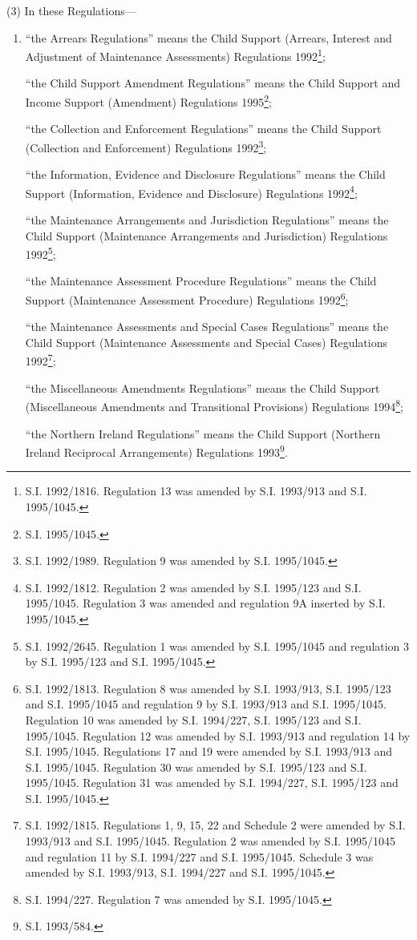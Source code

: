 \documentclass[a4paper]{article}
\begin{document}
(3) In these Regulations—
\begin{enumerate}\item[]
“the Arrears Regulations” means the Child Support (Arrears, Interest and Adjustment of Maintenance Assessments) Regulations 1992\footnote{\frenchspacing S.I. 1992/1816. Regulation 13 was amended by S.I. 1993/913 and S.I. 1995/1045.};

“the Child Support Amendment Regulations” means the Child Support and Income Support (Amendment) Regulations 1995\footnote{\frenchspacing S.I. 1995/1045.};

“the Collection and Enforcement Regulations” means the Child Support (Collection and Enforcement) Regulations 1992\footnote{\frenchspacing S.I. 1992/1989. Regulation 9 was amended by S.I. 1995/1045.};

“the Information, Evidence and Disclosure Regulations” means the Child Support (Information, Evidence and Disclosure) Regulations 1992\footnote{\frenchspacing S.I. 1992/1812. Regulation 2 was amended by S.I. 1995/123 and S.I. 1995/1045. Regulation 3 was amended and regulation 9A inserted by S.I. 1995/1045.};

“the Maintenance Arrangements and Jurisdiction Regulations” means the Child Support (Maintenance Arrangements and Jurisdiction) Regulations 1992\footnote{\frenchspacing S.I. 1992/2645. Regulation 1 was amended by S.I. 1995/1045 and regulation 3 by S.I. 1995/123 and S.I. 1995/1045.};

“the Maintenance Assessment Procedure Regulations” means the Child Support (Maintenance Assessment Procedure) Regulations 1992\footnote{\frenchspacing S.I. 1992/1813. Regulation 8 was amended by S.I. 1993/913, S.I. 1995/123 and S.I. 1995/1045 and regulation 9 by S.I. 1993/913 and S.I. 1995/1045. Regulation 10 was amended by S.I. 1994/227, S.I. 1995/123 and S.I. 1995/1045. Regulation 12 was amended by S.I. 1993/913 and regulation 14 by S.I. 1995/1045. Regulations 17 and 19 were amended by S.I. 1993/913 and S.I. 1995/1045. Regulation 30 was amended by S.I. 1995/123 and S.I. 1995/1045. Regulation 31 was amended by S.I. 1994/227, S.I. 1995/123 and S.I. 1995/1045.};

“the Maintenance Assessments and Special Cases Regulations” means the Child Support (Maintenance Assessments and Special Cases) Regulations 1992\footnote{\frenchspacing S.I. 1992/1815. Regulations 1, 9, 15, 22 and Schedule 2 were amended by S.I. 1993/913 and S.I. 1995/1045. Regulation 2 was amended by S.I. 1995/1045 and regulation 11 by S.I. 1994/227 and S.I. 1995/1045. Schedule 3 was amended by S.I. 1993/913, S.I. 1994/227 and S.I. 1995/1045.};

“the Miscellaneous Amendments Regulations” means the Child Support (Miscellaneous Amendments and Transitional Provisions) Regulations 1994\footnote{\frenchspacing S.I. 1994/227. Regulation 7 was amended by S.I. 1995/1045.};

“the Northern Ireland Regulations” means the Child Support (Northern Ireland Reciprocal Arrangements) Regulations 1993\footnote{\frenchspacing S.I. 1993/584.}.
\end{enumerate}
\end{document}
